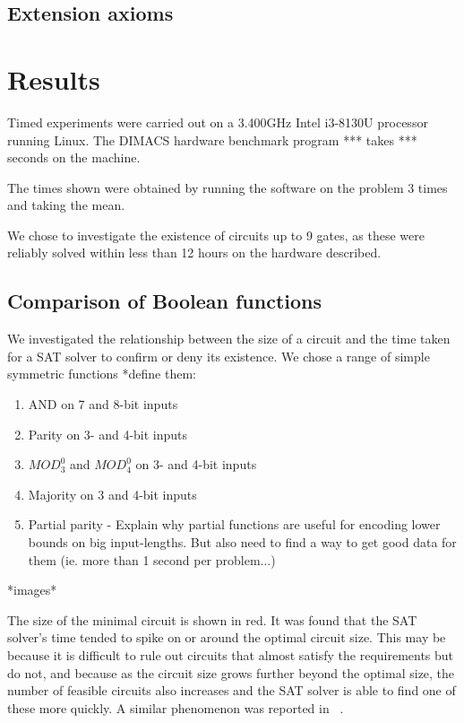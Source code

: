 \documentclass{article}
\begin{document}
\subsection{Extension axioms}

\section{Results}

Timed experiments were carried out on a 3.400GHz Intel i3-8130U processor running Linux. The DIMACS hardware benchmark program *** takes *** seconds on the machine. 

The times shown were obtained by running the software on the problem 3 times and taking the mean.

We chose to investigate the existence of circuits up to 9 gates, as these were reliably solved within less than 12 hours on the hardware described.

\subsection{Comparison of Boolean functions}

We investigated the relationship between the size of a circuit and the time taken for a SAT solver to confirm or deny its existence. We chose a range of simple symmetric functions *define them:

\begin{enumerate}
  \item AND on 7 and 8-bit inputs
  \item Parity on 3- and 4-bit inputs
  \item \(MOD^0_3\) and \(MOD^0_4\) on 3- and 4-bit inputs
  \item Majority on 3 and 4-bit inputs
  \item Partial parity - Explain why partial functions are useful for encoding lower bounds on big input-lengths. But also need to find a way to get good data for them (ie. more than 1 second per problem...)

\end{enumerate}

*images*

The size of the minimal circuit is shown in red. It was found that the SAT solver's time tended to spike on or around the optimal circuit size. This may be because it is difficult to rule out circuits that almost satisfy the requirements but do not, and because as the circuit size grows further beyond the optimal size, the number of feasible circuits also increases and the SAT solver is able to find one of these more quickly. A similar phenomenon was reported in ~\cite{estrada}.
\end{document}
